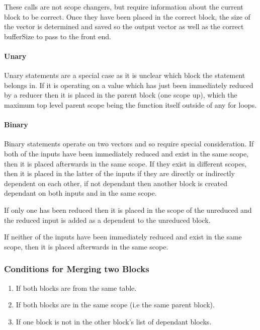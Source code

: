 These calls are not scope changers, but require information about the current block to be correct. Once they have been placed in the correct block, the size of the vector is determined and saved so the output vector as well as the correct bufferSize to pass to the front end.

\paragraph{Unary}

Unary statements are a special case as it is unclear which block the statement belongs in. If it is operating on a value which has just been immediately reduced by a reducer then it is placed in the parent block (one scope up), which the maximum top level parent scope being the function itself outside of any for loops. 

\paragraph{Binary}

Binary statements operate on two vectors and so require special consideration. 
If both of the inputs have been immediately reduced and exist in the same scope, then it is placed afterwards in the same scope. If they exist in different scopes, then it is placed in the latter of the inputs if they are directly or indirectly dependent on each other, if not dependant then another block is created dependant on both inputs and in the same scope.

If only one has been reduced then it is placed in the scope of the unreduced and the reduced input is added as a dependent to the unreduced block.

If neither of the inputs have been immediately reduced and exist in the same scope, then it is placed afterwards in the same scope. 

\subsubsection{Conditions for Merging two Blocks}
\begin{enumerate}
    \item If both blocks are from the same table.
    \item If both blocks are in the same scope (i.e the same parent block).
    \item If one block is not in the other block's list of dependant blocks.
\end{enumerate}

